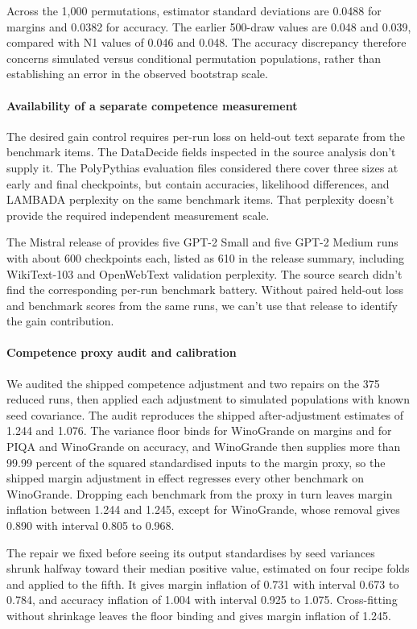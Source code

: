Across the 1,000 permutations, estimator standard deviations are 0.0488 for margins and 0.0382 for accuracy. The earlier 500-draw values are 0.048 and 0.039, compared with N1 values of 0.046 and 0.048. The accuracy discrepancy therefore concerns simulated versus conditional permutation populations, rather than establishing an error in the observed bootstrap scale.

\paragraph{Availability of a separate competence measurement}
The desired gain control requires per-run loss on held-out text separate from the benchmark items. The DataDecide fields inspected in the source analysis don't supply it. The PolyPythias evaluation files considered there cover three sizes at early and final checkpoints, but contain accuracies, likelihood differences, and LAMBADA perplexity on the same benchmark items. That perplexity doesn't provide the required independent measurement scale.

The Mistral release of \citet{karamcheti2021} provides five GPT-2 Small and five GPT-2 Medium runs with about 600 checkpoints each, listed as 610 in the release summary, including WikiText-103 and OpenWebText validation perplexity. The source search didn't find the corresponding per-run benchmark battery. Without paired held-out loss and benchmark scores from the same runs, we can't use that release to identify the gain contribution.

\paragraph{Competence proxy audit and calibration}
\label{app:proxy}
We audited the shipped competence adjustment and two repairs on the 375 reduced runs, then applied each adjustment to simulated populations with known seed covariance. The audit reproduces the shipped after-adjustment estimates of 1.244 and 1.076. The variance floor binds for WinoGrande on margins and for PIQA and WinoGrande on accuracy, and WinoGrande then supplies more than 99.99 percent of the squared standardised inputs to the margin proxy, so the shipped margin adjustment in effect regresses every other benchmark on WinoGrande. Dropping each benchmark from the proxy in turn leaves margin inflation between 1.244 and 1.245, except for WinoGrande, whose removal gives 0.890 with interval 0.805 to 0.968.

The repair we fixed before seeing its output standardises by seed variances shrunk halfway toward their median positive value, estimated on four recipe folds and applied to the fifth. It gives margin inflation of 0.731 with interval 0.673 to 0.784, and accuracy inflation of 1.004 with interval 0.925 to 1.075. Cross-fitting without shrinkage leaves the floor binding and gives margin inflation of 1.245.


